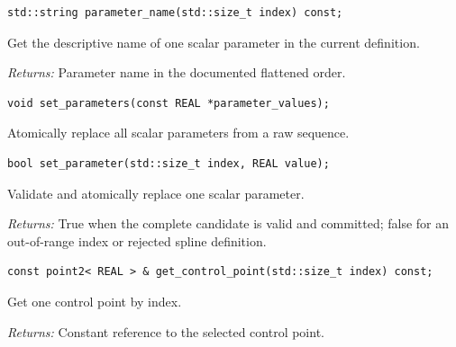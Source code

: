 \par\noindent\begin{minipage}{\linewidth}
\begin{lstlisting}[style=apireference]
std::string parameter_name(std::size_t index) const;
\end{lstlisting}
{\footnotesize Get the descriptive name of one scalar parameter in the current definition.\par}
{\footnotesize\textit{Returns:} Parameter name in the documented flattened order.\par}
\end{minipage}\par\vspace{1pt}
\par\noindent\begin{minipage}{\linewidth}
\begin{lstlisting}[style=apireference]
void set_parameters(const REAL *parameter_values);
\end{lstlisting}
{\footnotesize Atomically replace all scalar parameters from a raw sequence.\par}
\end{minipage}\par\vspace{1pt}
\par\noindent\begin{minipage}{\linewidth}
\begin{lstlisting}[style=apireference]
bool set_parameter(std::size_t index, REAL value);
\end{lstlisting}
{\footnotesize Validate and atomically replace one scalar parameter.\par}
{\footnotesize\textit{Returns:} True when the complete candidate is valid and committed; false for an out-of-range index or rejected spline definition.\par}
\end{minipage}\par\vspace{1pt}
\par\noindent\begin{minipage}{\linewidth}
\begin{lstlisting}[style=apireference]
const point2< REAL > & get_control_point(std::size_t index) const;
\end{lstlisting}
{\footnotesize Get one control point by index.\par}
{\footnotesize\textit{Returns:} Constant reference to the selected control point.\par}
\end{minipage}\par\vspace{1pt}
